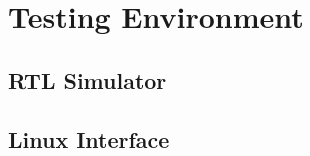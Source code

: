\documentclass[../main.tex]{subfiles}
\begin{document}
\section{Testing Environment}
\blindtext
\subsection{RTL Simulator}
\blindtext
\subsection{Linux Interface}
\blindtext
\end{document}
